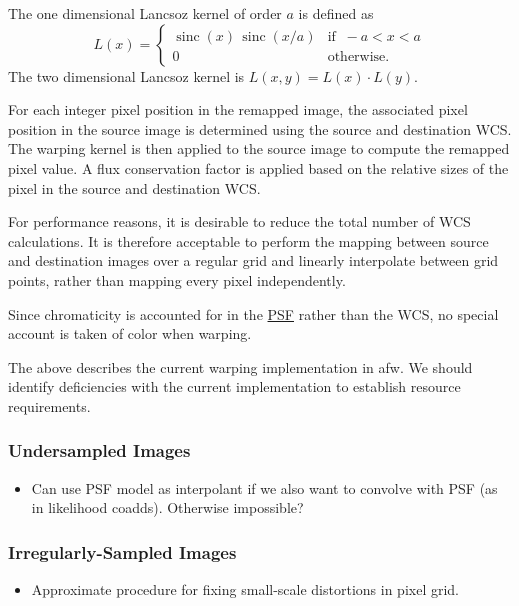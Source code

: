 The one dimensional Lancsoz kernel of order $a$ is defined as
\[
L(x) = \begin{cases}
       \operatorname{sinc}(x)\, \operatorname{sinc}(x/a) & \text{if}\;\; -a < x < a\\ 0 & \text{otherwise.}
       \end{cases}
\]
The two dimensional Lancsoz kernel is $L(x, y) = L(x) \cdot L(y)$.

For each integer pixel position in the remapped image, the associated pixel position in the source image is determined using the source and destination WCS. The warping kernel is then applied to the source image to compute the remapped pixel value. A flux conservation factor is applied based on the relative sizes of the pixel in the source and destination WCS.

For performance reasons, it is desirable to reduce the total number of WCS calculations. It is therefore acceptable to perform the mapping between source and destination images over a regular grid and linearly interpolate between grid points, rather than mapping every pixel independently.

Since chromaticity is accounted for in the \hyperref[sec:spPSF]{PSF} rather than the WCS, no special account is taken of color when warping.

\begin{note}
The above describes the current warping implementation in afw. We should identify deficiencies with the current implementation to establish resource requirements.
\end{note}

\subsubsection{Undersampled Images}
\label{sec:acUndersampledWarping}
\begin{itemize}
\item Can use PSF model as interpolant if we also want to convolve with PSF (as in likelihood coadds).  Otherwise impossible?
\end{itemize}
\subsubsection{Irregularly-Sampled Images}
\label{sec:acFixPixelAreaVariations}
\begin{itemize}
\item Approximate procedure for fixing small-scale distortions in pixel grid.
\end{itemize}

